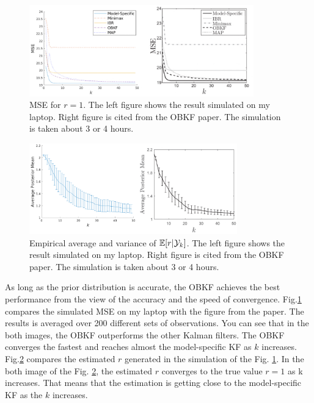 \begin{figure}[H]
    \begin{center}
    \includegraphics[width=9.7cm]{img/r1_mse.eps}
    \caption{MSE for $r=1$. The left figure shows the result simulated on my laptop. Right figure is cited from the OBKF paper\cite{Dehghannasiri2018}. The simulation is taken about 3 or 4 hours.}
    \label{fig:mse_r1}
    \end{center}
\end{figure}
\begin{figure}[H]
    \begin{center}
    \includegraphics[width=9.0cm]{img/r1_mean.eps}
    \caption{Empirical average and variance of $\mathbb{E}[r|\mathcal{Y}_k]$. The left figure shows the result simulated on my laptop. Right figure is cited from the OBKF paper\cite{Dehghannasiri2018}. The simulation is taken about 3 or 4 hours.}
    \label{fig:mean_r1}
    \end{center}
\end{figure}

As long as the prior distribution is accurate, the OBKF achieves the best performance from the view of the accuracy and the speed of convergence. Fig.\ref{fig:mse_r1} compares the simulated MSE on my laptop with the figure from the paper. The results is averaged over 200 different sets of observations. You can see that in the both images, the OBKF outperforms the other Kalman filters. The OBKF converges the fastest and reaches almost the model-specific KF as $k$ increases. Fig.\ref{fig:mean_r1} compares the estimated $r$ generated in the simulation of the Fig. \ref{fig:mse_r1}. In the both image of the Fig. \ref{fig:mean_r1}, the estimated $r$ converges to the true value $r=1$ as k increases. That means that the estimation is getting close to the model-specific KF as the $k$ increases.

